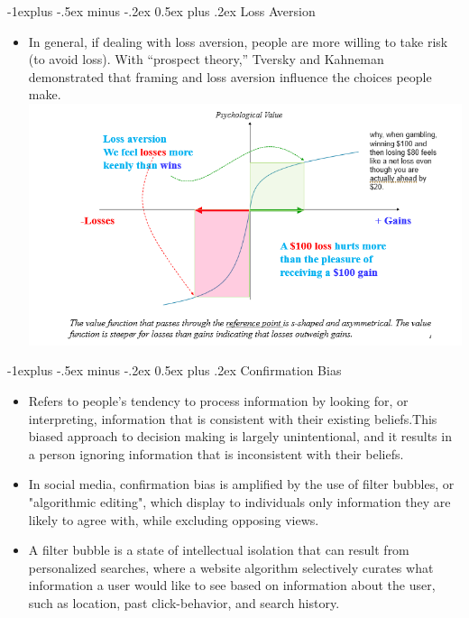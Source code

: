 \documentclass[12pt, landscape]{article}
\makeatletter
\renewcommand{\subsection}{\@startsection{subsection}{2}{0mm}%
                                {-1explus -.5ex minus -.2ex}%
                                {0.5ex plus .2ex}%
                                {\normalfont\normalsize\bfseries}}
\makeatother
\begin{document}
\begin{multicols*}{3}
\subsection{Loss Aversion}
\begin{itemize}
\item In general, if dealing with loss aversion, people are more willing to take risk (to avoid loss). With “prospect theory,” Tversky and Kahneman demonstrated that framing and loss aversion influence the choices people make. 
\includegraphics[width =\linewidth]{lossAversion}
\end{itemize}
\subsection{Confirmation Bias}
\begin{itemize}
\item Refers to people's tendency to process information by looking for, or interpreting, information that is consistent with their existing beliefs.This biased approach to decision making is largely unintentional, and it results in a person ignoring information that is inconsistent with their beliefs.
\item In social media, confirmation bias is amplified by the use of filter bubbles, or "algorithmic editing", which display to individuals only information they are likely to agree with, while excluding opposing views.\item A filter bubble is a state of intellectual isolation that can result from personalized searches, where a website algorithm selectively curates what information a user would like to see based on information about the user, such as location, past click-behavior, and search history.
\end{itemize}

\end{multicols*}
\end{document}

